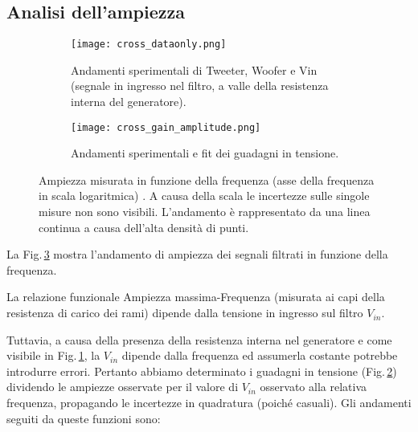 \documentclass[../Relazione_circuiti]{subfiles}
\begin{document}
\subsection{Analisi dell'ampiezza}

  \begin{figure}[H]
    \centering

    \begin{subfigure}[t]{=0.49\textwidth}

      \texttt{[image: cross\_dataonly.png]}

      \caption{Andamenti sperimentali di Tweeter, Woofer e Vin (segnale in ingresso nel filtro,
        a valle della resistenza interna del generatore).}
      \label{fig: amplitude_dataonly}

    \end{subfigure}
    \hfill
    \begin{subfigure}[t]{=0.49\textwidth}

      \texttt{[image: cross\_gain\_amplitude.png]}

      \caption
      {Andamenti sperimentali e fit dei guadagni in tensione.}
      \label{fig:cross_gain}
    \end{subfigure}

    \caption{Ampiezza misurata in funzione della frequenza (asse della frequenza in scala logaritmica)
      . A causa della scala le incertezze sulle singole misure non sono visibili. L'andamento è rappresentato da una
      linea continua a causa dell'alta densità di punti.}

    \label{fig:cross_amplitude}

  \end{figure}

  La Fig.\,\ref{fig:cross_amplitude} mostra l'andamento di ampiezza dei segnali filtrati in funzione della frequenza.

  La relazione funzionale Ampiezza massima-Frequenza (misurata ai capi della resistenza di carico dei rami) dipende
  dalla tensione in ingresso sul filtro $V_{in}$.

  Tuttavia, a causa della presenza della resistenza interna nel generatore e come visibile in
  Fig.\,\ref{fig: amplitude_dataonly}, la $V_{in}$
  dipende dalla frequenza ed assumerla costante potrebbe introdurre errori.
  Pertanto abbiamo determinato i guadagni in tensione (Fig.\,\ref{fig:cross_gain}) dividendo le ampiezze osservate per
  il valore di $V_{in}$
  osservato alla relativa frequenza, propagando le incertezze in quadratura (poiché casuali).
  Gli andamenti seguiti da queste funzioni sono:
\end{document}
